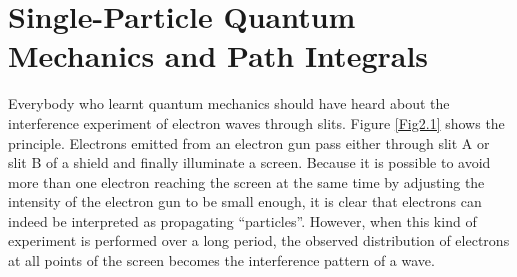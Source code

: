 
\section{Single-Particle Quantum Mechanics and Path Integrals}

Everybody who learnt quantum mechanics should have heard about the interference experiment of electron waves through slits. Figure \ref{Fig2.1} shows the principle. Electrons emitted from an electron gun pass either through slit A or slit B of a shield and finally illuminate a screen. Because it is possible to avoid more than one electron reaching the screen at the same time by adjusting the intensity of the electron gun to be small enough, it is clear that electrons can indeed be interpreted as propagating “particles”. However, when this kind of experiment is performed over a long period, the observed distribution of electrons at all points of the screen becomes the interference pattern of a wave.

